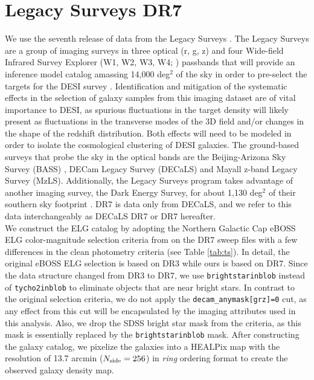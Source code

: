 \section{Legacy Surveys DR7}\label{sec:data}
We use the seventh release of data from the Legacy Surveys \citep{dey2018overview}. The Legacy Surveys are a group of imaging surveys in three optical (r, g, z) and four Wide-field Infrared Survey Explorer (W1, W2, W3, W4; \citet{wright2010wide}) passbands that will provide an inference model catalog amassing 14,000 deg$^{2}$ of the sky in order to pre-select the targets for the DESI survey \citep{lang2016tractor, aghamousa2016desi}. Identification and mitigation of the systematic effects in the selection of galaxy samples from this imaging dataset are of vital importance to DESI, as spurious fluctuations in the target density will likely present as fluctuations in the transverse modes of the 3D field and/or changes in the shape of the redshift distribution. Both effects will need to be modeled in order to isolate the cosmological clustering of DESI galaxies. The ground-based surveys that probe the sky in the optical bands are the Beijing-Arizona Sky Survey (BASS) \citep{zou2017project}, DECam Legacy Survey (DECaLS) and Mayall z-band Legacy Survey (MzLS)\citep[see e.g.,][]{dey2018overview}. Additionally, the Legacy Surveys program takes advantage of another imaging survey, the Dark Energy Survey, for about 1,130 deg$^{2}$ of their southern sky footprint \citep{dark2005dark}. DR7 is data only from DECaLS, and we refer to this data interchangeably as DECaLS DR7 or DR7 hereafter.\\


We construct the ELG catalog by adopting the Northern Galactic Cap eBOSS ELG color-magnitude selection criteria from \citet{Raichoor2017MNRAS.471.3955R} on the DR7 sweep files \citep{dey2018overview} with a few differences in the clean photometry criteria (see Table \ref{tab:ts}). In detail, the original eBOSS ELG selection is based on DR3 while ours is based on DR7. Since the data structure changed from DR3 to DR7, we use \texttt{brightstarinblob} instead of \texttt{tycho2inblob} to eliminate objects that are near bright stars. In contrast to the original selection criteria, we do not apply the \texttt{decam\_anymask[grz]=0} cut, as any effect from this cut will be encapsulated by the imaging attributes used in this analysis. Also, we drop the SDSS bright star mask from the criteria, as this mask is essentially replaced by the \texttt{brightstarinblob} mask. After constructing the galaxy catalog, we pixelize the galaxies into a HEALPix map \citep{gorski2005healpix} with the resolution of 13.7 arcmin ($N_{{\rm side}} = 256$)  in \textit{ring} ordering format to create the observed galaxy density map.\\

